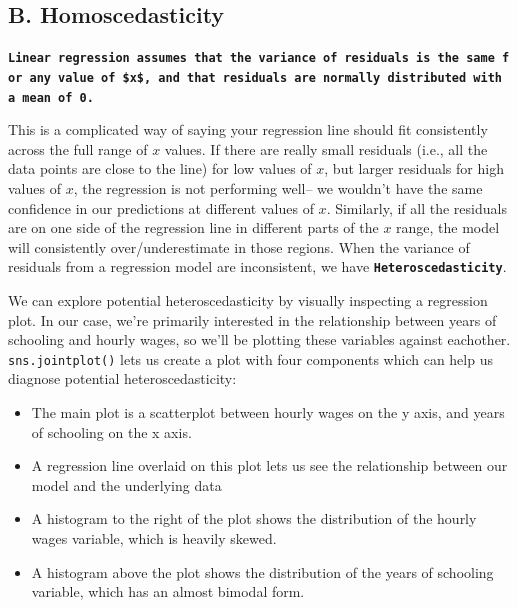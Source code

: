 \documentclass[
  letterpaper,
  DIV=11,
  numbers=noendperiod]{scrreprt}
\providecommand{\tightlist}{%
  \setlength{\itemsep}{0pt}\setlength{\parskip}{0pt}}\usepackage{longtable,booktabs,array}
\begin{document}
\hypertarget{b.-homoscedasticity}{%
\subsection{B. Homoscedasticity}\label{b.-homoscedasticity}}

\textbf{\texttt{Linear\ regression\ assumes\ that\ the\ variance\ of\ residuals\ is\ the\ same\ for\ any\ value\ of\ \$x\$,\ and\ that\ residuals\ are\ normally\ distributed\ with\ a\ mean\ of\ 0.}}

This is a complicated way of saying your regression line should fit
consistently across the full range of \(x\) values. If there are really
small residuals (i.e., all the data points are close to the line) for
low values of \(x\), but larger residuals for high values of \(x\), the
regression is not performing well-- we wouldn't have the same confidence
in our predictions at different values of \(x\). Similarly, if all the
residuals are on one side of the regression line in different parts of
the \(x\) range, the model will consistently over/underestimate in those
regions. When the variance of residuals from a regression model are
inconsistent, we have \textbf{\texttt{Heteroscedasticity}}.

We can explore potential heteroscedasticity by visually inspecting a
regression plot. In our case, we're primarily interested in the
relationship between years of schooling and hourly wages, so we'll be
plotting these variables against eachother. \texttt{sns.jointplot()}
lets us create a plot with four components which can help us diagnose
potential heteroscedasticity:

\begin{itemize}
\tightlist
\item
  The main plot is a scatterplot between hourly wages on the y axis, and
  years of schooling on the x axis.
\item
  A regression line overlaid on this plot lets us see the relationship
  between our model and the underlying data
\item
  A histogram to the right of the plot shows the distribution of the
  hourly wages variable, which is heavily skewed.
\item
  A histogram above the plot shows the distribution of the years of
  schooling variable, which has an almost bimodal form.
\end{itemize}
\end{document}
